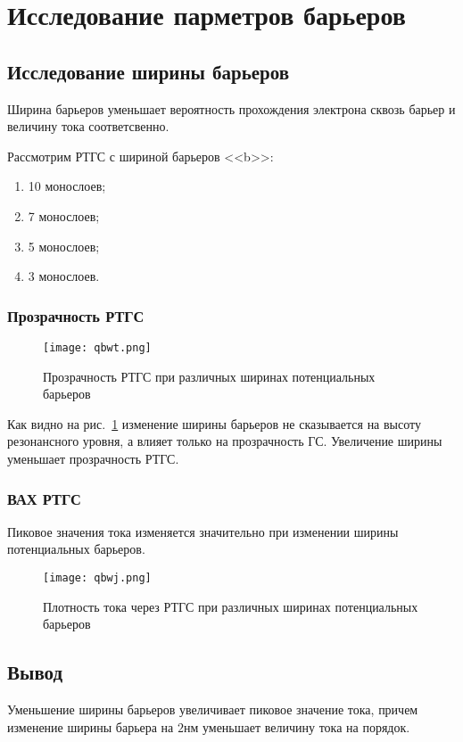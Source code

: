 \section{Исследование парметров барьеров}

\subsection{Исследование ширины барьеров}
Ширина барьеров уменьшает вероятность прохождения электрона сквозь барьер и величину тока соответсвенно. 

Рассмотрим РТГС с шириной барьеров <<b>>:
\begin{enumerate}
	\item 10 монослоев;
	\item 7 монослоев;
	\item 5 монослоев;
	\item 3 монослоев.
\end{enumerate}

\subsubsection{Прозрачность РТГС}
\begin{figure}[h]
	\centering
	\texttt{[image: qbwt.png]}
	\caption{Прозрачность РТГС при различных ширинах потенциальных барьеров}
	\label{fig:qbwt}
\end{figure}

Как видно на рис.~\ref{fig:qbwt} изменение ширины барьеров не сказывается на высоту резонансного уровня, а влияет только на прозрачность ГС. Увеличение ширины уменьшает прозрачность РТГС.

\subsubsection{ВАХ РТГС}
Пиковое значения тока изменяется значительно при изменении ширины потенциальных барьеров.
\begin{figure}[h]
	\centering
	\texttt{[image: qbwj.png]}
	\caption{Плотность тока через РТГС при различных ширинах потенциальных барьеров}
	\label{fig:qbwj}
\end{figure}

\subsection{Вывод}
Уменьшение ширины барьеров увеличивает пиковое значение тока, причем изменение ширины барьера на $2$нм уменьшает величину тока на порядок.